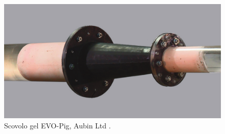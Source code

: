 \begin{figure}[htbp]
	\centering
	\includegraphics[width=.7\textwidth]{fig/pig/gelpig}
	\caption{Scovolo gel EVO-Pig, Aubin Ltd \parencite{johnston2015breaking}.}
	\label{fig:gelpig}
\end{figure}



